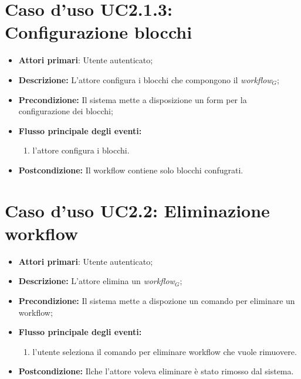 		\section{Caso d'uso UC2.1.3: Configurazione blocchi }
		\begin{itemize}
			\item \textbf{Attori primari}: Utente autenticato;
			\item \textbf{Descrizione:} L'attore configura i blocchi che compongono il \textit{workflow$_{G}$};
			\item \textbf{Precondizione:} Il sistema mette a disposizione un form per la configurazione dei blocchi;
			\item \textbf{Flusso principale degli eventi:}
			\begin{enumerate}
				\item l'attore configura i blocchi.
			\end{enumerate}
			\item \textbf{Postcondizione:} Il workflow contiene solo blocchi confugrati.
		\end{itemize}
		\section{Caso d'uso UC2.2: Eliminazione workflow}
		\begin{itemize}
			\item \textbf{Attori primari}: Utente autenticato;
			\item \textbf{Descrizione:} L'attore elimina un \textit{workflow$_{G}$};
			\item \textbf{Precondizione:} Il sistema mette a dispozione un comando per eliminare un workflow;
			\item \textbf{Flusso principale degli eventi:}
			\begin{enumerate}
				\item l'utente seleziona il comando per eliminare workflow che vuole rimuovere.
			\end{enumerate}
			\item \textbf{Postcondizione:} Ilche l'attore voleva eliminare è stato rimosso dal sistema.
		\end{itemize}
